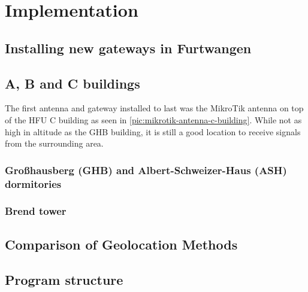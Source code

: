 \chapter{Implementation}

\section{Installing new gateways in Furtwangen}

\section{A, B and C buildings}

The first antenna and gateway installed to last was the MikroTik antenna on top of the \ac{HFU} C building as seen in \cref{pic:mikrotik-antenna-c-building}.
While not as high in altitude as the GHB building, it is still a good location to receive signals from the surrounding area.

\subsection{Großhausberg (GHB) and Albert-Schweizer-Haus (ASH) dormitories}

\subsection{Brend tower}

\section{Comparison of Geolocation Methods}

\section{Program structure}